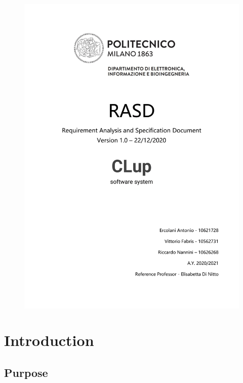 \documentclass[]{article}
\begin{document}
	
	\begin{figure}[H]
		\centering
		\includegraphics[scale=0.29]{FrontPage.png}
	\end{figure}

	\newpage

	


	\tableofcontents
	
	\newpage
	
	
	\section{Introduction}
	
	\subsection{Purpose}
	
\end{document}
